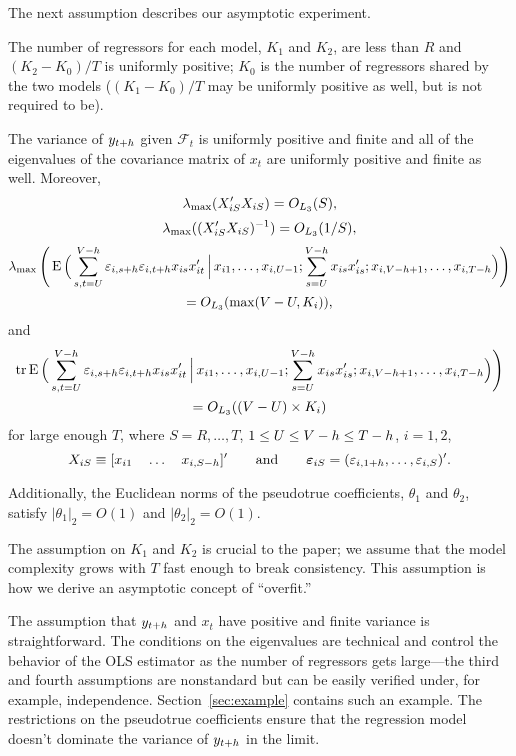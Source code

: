 \documentclass[12pt,draft]{article}
\begin{document}
The next assumption describes our asymptotic experiment.
\begin{asmp}\label{asmp-2}
  The number of regressors for each model, $K_1$ and $K_2$, are less
  than $R$ and $(K_2-K_0)/T$ is uniformly positive;
  $K_0$ is the number of regressors shared by the two models ($(K_1 - K_0)/T$
  may be uniformly positive as well, but is not required to be).

  The variance of $y_{t+h}$ given $\mathcal{F}_t$ is uniformly
  positive and finite and all of the eigenvalues of the covariance
  matrix of $x_t$ are uniformly positive and finite as well.
  Moreover,
  \begin{equation}
    \operatorname{\lambda}_{\max}(X_{iS}'X_{iS}) = O_{L_3}(S),
  \end{equation}
  \begin{equation}
    \operatorname{\lambda}_{\max}((X_{iS}'X_{iS})^{-1}) = O_{L_3}(1/S),
  \end{equation}
  \begin{multline}\label{eq:28}
    \operatorname{\lambda}_{\max}\Bigg(\operatorname{E}\Big(
    \sum_{s,t=U}^{V-h} \varepsilon_{i,s+h} \varepsilon_{i,t+h} x_{is}x_{it}'
    \,\Big|\,
    x_{i1},\dots,x_{i,U-1};
    \sum_{s=U}^{V-h} x_{is} x_{is}';
    x_{i,V-h+1},\dots,x_{i,T-h}
    \Big)\Bigg) \\
    = O_{L_3}(\max(V-U, K_i)),
  \end{multline}
  and
  \begin{multline}\label{eq:8}
    \operatorname{tr} \operatorname{E}\Big(
    \sum_{s,t=U}^{V-h} \varepsilon_{i,s+h} \varepsilon_{i,t+h} x_{is}x_{it}'
    \,\Big|\,
    x_{i1},\dots,x_{i,U-1};
    \sum_{s=U}^{V-h} x_{is} x_{is}';
    x_{i,V-h+1},\dots,x_{i,T-h}
    \Big)\Bigg) \\
    = O_{L_3}((V-U) \times K_i)
  \end{multline}
  for large enough $T$, where $S = R,\dots,T$, $1 \leq U \leq V - h
  \leq T - h$, $i = 1,2$,
  \[ X_{iS} \equiv [x_{i1} \quad \dots \quad x_{i,S-h}]' \qquad
  \text{and} \qquad \boldsymbol{\varepsilon}_{iS} = (\varepsilon_{i,1+h}, \dots, \varepsilon_{i,S})'.\]

  Additionally, the Euclidean norms of the pseudotrue coefficients,
  $\theta_1$ and $\theta_2$, satisfy $|\theta_1|_2 = O(1)$ and
  $|\theta_2|_2 = O(1)$.
\end{asmp}

The assumption on $K_1$ and $K_2$ is crucial to the paper; we assume
that the model complexity grows with $T$ fast enough to break
consistency. This assumption is how we derive an asymptotic
concept of ``overfit.''

The assumption that $y_{t+h}$ and $x_t$ have positive and finite
variance is straightforward. The conditions on the eigenvalues are
technical and control the behavior of the OLS estimator as the number
of regressors gets large---the third and fourth assumptions are
nonstandard but can be easily verified under, for example,
independence. Section~\ref{sec:example} contains such an example. The
restrictions on the pseudotrue coefficients ensure that the regression
model doesn't dominate the variance of $y_{t+h}$ in the limit.
\end{document}
